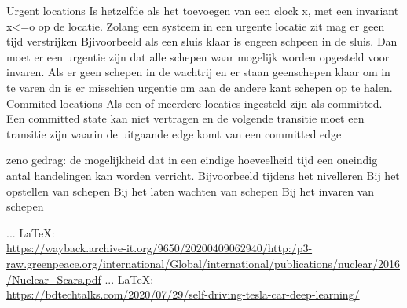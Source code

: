 \begin{thebibliography}{99}
{{{{{{%
%
%
%
%
%
%

Urgent locations
Is hetzelfde als het toevoegen van een clock x, met een invariant x<=o op de locatie. Zolang een systeem in een urgente locatie zit mag er geen tijd verstrijken
Bjivoorbeeld als een sluis klaar is engeen schpeen in de sluis. Dan moet er een urgentie zijn dat alle schepen waar mogelijk worden opgesteld voor invaren. Als er geen schepen in de wachtrij en er staan geenschepen klaar om in te varen dn is er misschien urgentie om aan de andere kant schepen op te halen.
Commited locations
Als een of meerdere locaties ingesteld zijn als committed. Een committed state kan niet vertragen  en de volgende transitie moet een transitie zijn waarin de uitgaande edge komt van een committed edge


zeno gedrag: de mogelijkheid dat in een eindige hoeveelheid tijd een oneindig antal handelingen kan worden verricht.
Bijvoorbeeld tijdens het nivelleren
Bij het opstellen van schepen
Bij het laten wachten van schepen
Bij het invaren van schepen



 ... \LaTeX:\\ \url{https://wayback.archive-it.org/9650/20200409062940/http:/p3-raw.greenpeace.org/international/Global/international/publications/nuclear/2016/Nuclear_Scars.pdf}
 ... \LaTeX:\\ \url{https://bdtechtalks.com/2020/07/29/self-driving-tesla-car-deep-learning/}



}}}}}}
\end{thebibliography}
